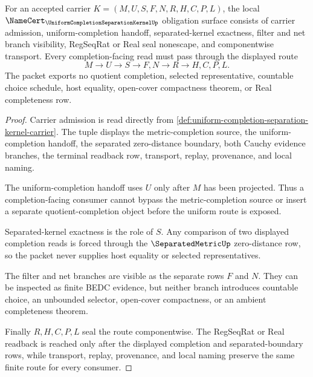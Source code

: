 \begin{theorem}
\label{thm:uniform-completion-separation-kernel-namecert-obligations}
For an accepted carrier $K=(M,U,S,F,N,R,H,C,P,L)$, the local $\NameCert_{\UniformCompletionSeparationKernelUp}$ obligation surface consists of carrier admission, uniform-completion handoff, separated-kernel exactness, filter and net branch visibility, RegSeqRat or Real seal nonescape, and componentwise transport. Every completion-facing read must pass through the displayed route
$$
M \to U \to S \to F,N \to R \to H,C,P,L .
$$
The packet exports no quotient completion, selected representative, countable choice schedule, host equality, open-cover compactness theorem, or Real completeness row.
\end{theorem}
\begin{proof}
Carrier admission is read directly from \autoref{def:uniform-completion-separation-kernel-carrier}. The tuple displays the metric-completion source, the uniform-completion handoff, the separated zero-distance boundary, both Cauchy evidence branches, the terminal readback row, transport, replay, provenance, and local naming.

The uniform-completion handoff uses $U$ only after $M$ has been projected. Thus a completion-facing consumer cannot bypass the metric-completion source or insert a separate quotient-completion object before the uniform route is exposed.

Separated-kernel exactness is the role of $S$. Any comparison of two displayed completion reads is forced through the $\SeparatedMetricUp$ zero-distance row, so the packet never supplies host equality or selected representatives.

The filter and net branches are visible as the separate rows $F$ and $N$. They can be inspected as finite BEDC evidence, but neither branch introduces countable choice, an unbounded selector, open-cover compactness, or an ambient completeness theorem.

Finally $R,H,C,P,L$ seal the route componentwise. The RegSeqRat or Real readback is reached only after the displayed completion and separated-boundary rows, while transport, replay, provenance, and local naming preserve the same finite route for every consumer.
\end{proof}

